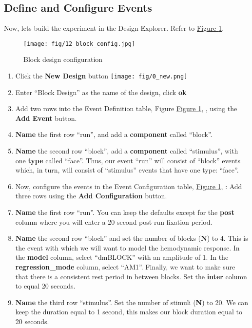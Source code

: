 \documentclass[10pt]{article}
\newcommand*\circled[1]{\tikz[baseline=(char.base)]{
            \node[shape=circle,draw,inner sep=.5pt] (char) {#1};}}
\newcommand*{\nbut}{\texttt{[image: fig/0\_new.png]}}
\begin{document}
	\subsection{Define and Configure Events}
	\label{subsec:u3define}
		Now, lets build the experiment in the Design Explorer.
		Refer to \hyperref[fig:block_config]{Figure \ref{fig:block_config}}.
		\begin{figure}[ht]
			\centering
			\texttt{[image: fig/12\_block\_config.jpg]}
			\caption{Block design configuration}
			\label{fig:block_config}
		\end{figure}
		\begin{enumerate}
			\item Click the \textbf{New Design} button \nbut{}
			\item Enter ``Block Design'' as the name of the design, click \textbf{ok}
			\item Add two rows into the Event Definition table, Figure \hyperref[fig:block_config]{Figure \ref{fig:block_config}}, \circled{1}, using the \textbf{Add Event} button.
			\item \textbf{Name} the first row ``run'', and add a \textbf{component} called ``block''.
			\item \textbf{Name} the second row ``block'', add a \textbf{component} called ``stimulus'', with one \textbf{type} called ``face''.
			Thus, our event ``run'' will consist of ``block'' events which, in turn, will consist of ``stimulus'' events that have one type: ``face''.
			\item Now, configure the events in the Event Configuration table, \hyperref[fig:block_config]{Figure \ref{fig:block_config}}, \circled{2}: Add three rows using the \textbf{Add Configuration} button.
			\item \textbf{Name} the first row ``run''.
			You can keep the defaults except for the \textbf{post} column where you will enter a 20 second post-run fixation period.
			\item \textbf{Name} the second row ``block'' and set the number of blocks (\textbf{N}) to 4.
			This is the event with which we will want to model the hemodynamic response.
			In the \textbf{model} column, select ``dmBLOCK'' with an amplitude of 1.
			In the \textbf{regression\_mode} column, select ``AM1''.
			Finally, we want to make sure that there is a consistent rest period in between blocks.
			Set the \textbf{inter} column to equal 20 seconds.
			\item \textbf{Name} the third row ``stimulus''.
			Set the number of stimuli (\textbf{N}) to 20.
			We can keep the duration equal to 1 second, this makes our block duration equal to 20 seconds.
		\end{enumerate}
\end{document}
